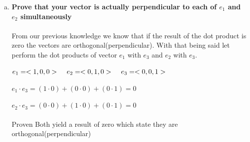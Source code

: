 \documentclass{article}
\begin{document}
\begin{enumerate}[c.]
	\item\textbf{Prove that your vector is actually perpendicular to each of $e_{1}$ and $e_{2}$ simultaneously}\\
	\\
	From our previous knowledge we know that if the result of the dot product is zero the vectors are orthogonal(perpendicular). With that being said let perform the dot products of vector $e_{1}$ with $e_{3}$ and $e_{2}$ with $e_{3}$.\\
	\\
	$e_{1}=<1,0,0>\hspace{.4cm}e_{2}=<0,1,0>\hspace{.4cm}e_{3}=<0,0,1>$\\
	\\
	$e_{1} \cdot e_{3}=(1 \cdot 0) + (0 \cdot 0 ) + (0 \cdot 1) = 0$\\
	\\
	$e_{2} \cdot e_{3}=(0 \cdot 0) + (1 \cdot 0 ) + (0 \cdot 1) = 0$\\
	\\
	Proven Both yield a result of zero which state they are orthogonal(perpendicular)
\end{enumerate}
\end{document}
